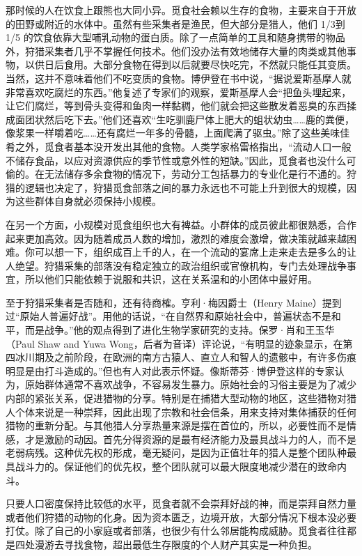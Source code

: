 那时候的人在饮食上跟熊也大同小异。觅食社会赖以生存的食物，主要来自于开放的田野或附近的水体中。虽然有些采集者是渔民，但大部分是猎人，他们 1/3到 1/5 的饮食依靠大型哺乳动物的蛋白质。除了一点简单的工具和随身携带的物品外，狩猎采集者几乎不掌握任何技术。他们没办法有效地储存大量的肉类或其他事物，以供日后食用。大部分食物在得到以后就要尽快吃完，不然就只能任其变质。当然，这并不意味着他们不吃变质的食物。博伊登在书中说，“据说爱斯基摩人就非常喜欢吃腐烂的东西。”他复述了专家们的观察，爱斯基摩人会“把鱼头埋起来，让它们腐烂，等到骨头变得和鱼肉一样黏稠，他们就会把这些散发着恶臭的东西揉成面团状然后吃下去。”他们还喜欢“生吃驯鹿尸体上肥大的蛆状幼虫……鹿的粪便，像浆果一样嚼着吃……还有腐烂一年多的骨髓，上面爬满了驱虫。”除了这些美味佳肴之外，觅食者基本没开发出其他的食物。人类学家格雷格指出，“流动人口一般不储存食品，以应对资源供应的季节性或意外性的短缺。”因此，觅食者也没什么可偷的。在无法储存多余食物的情况下，劳动分工包括暴力的专业化是行不通的。狩猎的逻辑也决定了，狩猎觅食部落之间的暴力永远也不可能上升到很大的规模，因为这些群体自身就必须保持小规模。

在另一个方面，小规模对觅食组织也大有裨益。小群体的成员彼此都很熟悉，合作起来更加高效。因为随着成员人数的增加，激烈的难度会激增，做决策就越来越困难。你可以想一下，组织成百上千的人，在一个流动的宴席上走来走去是多么的让人绝望。狩猎采集的部落没有稳定独立的政治组织或官僚机构，专门去处理战争事宜，所以他们只能依赖于说服和共识，这在关系温和的小团体中最好用。

至于狩猎采集者是否随和，还有待商榷。亨利·梅因爵士（Henry Maine）提到过“原始人普遍好战”。用他的话说，“在自然界和原始社会中，普遍状态不是和平，而是战争。”他的观点得到了进化生物学家研究的支持。保罗·肖和王玉华（Paul Shaw and Yuwa Wong，后者为音译）评论说，“有明显的迹象显示，在第四冰川期及之前阶段，在欧洲的南方古猿人、直立人和智人的遗骸中，有许多伤痕明显是由打斗造成的。”但也有人对此表示怀疑。像斯蒂芬·博伊登这样的专家认为，原始群体通常不喜欢战争，不容易发生暴力。原始社会的习俗主要是为了减少内部的紧张关系，促进猎物的分享。特别是在捕猎大型动物的地区，这些猎物对猎人个体来说是一种崇拜，因此出现了宗教和社会信条，用来支持对集体捕获的任何猎物的重新分配。与其他猎人分享热量来源是摆在首位的，所以，必要性而不是情感，才是激励的动因。首先分得资源的是最有经济能力及最具战斗力的人，而不是老弱病残。这种优先权的形成，毫无疑问，是因为正值壮年的猎人是整个团队种最具战斗力的。保证他们的优先权，整个团队就可以最大限度地减少潜在的致命内斗。

只要人口密度保持比较低的水平，觅食者就不会崇拜好战的神，而是崇拜自然力量或者他们狩猎的动物的化身。因为资本匮乏，边境开放，大部分情况下根本没必要打仗。除了自己的小家庭或者部落，也很少有什么邻居能构成威胁。觅食者往往都是四处漫游去寻找食物，超出最低生存限度的个人财产其实是一种负担。

